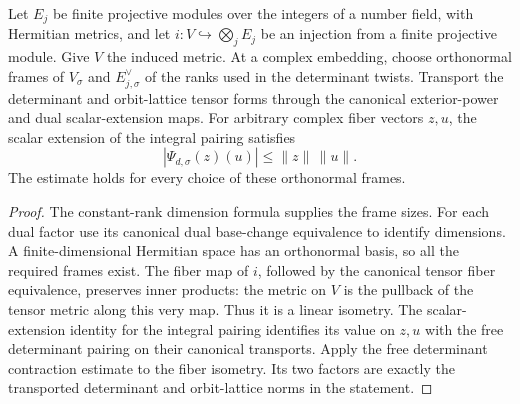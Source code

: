 \begin{lemma}
\label{lem:intrinsic-pairing-contraction}
\leanok
{}
Let $E_j$ be finite projective modules over the integers of a number field,
with Hermitian metrics, and let $i:V\hookrightarrow\bigotimes_j E_j$ be an
injection from a finite projective module. Give $V$ the induced metric.
At a complex embedding, choose orthonormal frames of $V_\sigma$ and
$E_{j,\sigma}^{\vee}$ of the ranks used in the determinant twists.
Transport the determinant and orbit-lattice tensor forms through the canonical
exterior-power and dual scalar-extension maps. For arbitrary complex fiber
vectors $z,u$, the scalar extension of the integral pairing satisfies
\[
 |\Psi_{d,\sigma}(z)(u)|\leq\|z\|\,\|u\|.
\]
The estimate holds for every choice of these orthonormal frames.
\end{lemma}
\begin{proof}
The constant-rank dimension formula supplies the frame sizes. For each
dual factor use its canonical dual base-change equivalence to identify
dimensions. A finite-dimensional Hermitian space has an orthonormal basis,
so all the required frames exist.
The fiber map of $i$, followed by the canonical tensor fiber equivalence,
preserves inner products: the metric on $V$ is the pullback of the tensor
metric along this very map. Thus it is a linear isometry. The scalar-extension
identity for the integral pairing identifies its value on $z,u$ with the
free determinant pairing on their canonical transports. Apply the free
determinant contraction estimate to the fiber isometry. Its two factors are
exactly the transported determinant and orbit-lattice norms in the statement.
\end{proof}

